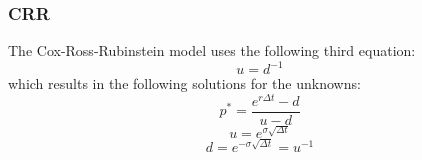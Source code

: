 \documentclass[10pt]{article}
\begin{document}
\subsubsection{CRR}
The Cox-Ross-Rubinstein model uses the following third equation:\\
    \begin{equation}
        u = d^{-1}
    \end{equation}
which results in the following solutions for the unknowns:
    \begin{equation}
        p^{*} = \frac{e^{r\Delta t}-d}{u-d}
    \end{equation}
    \begin{equation}
        u = e^{\sigma\sqrt{\Delta t}}
    \end{equation}
    \begin{equation}
        d = e^{-\sigma\sqrt{\Delta t}} = u^{-1}
    \end{equation}
\end{document}
